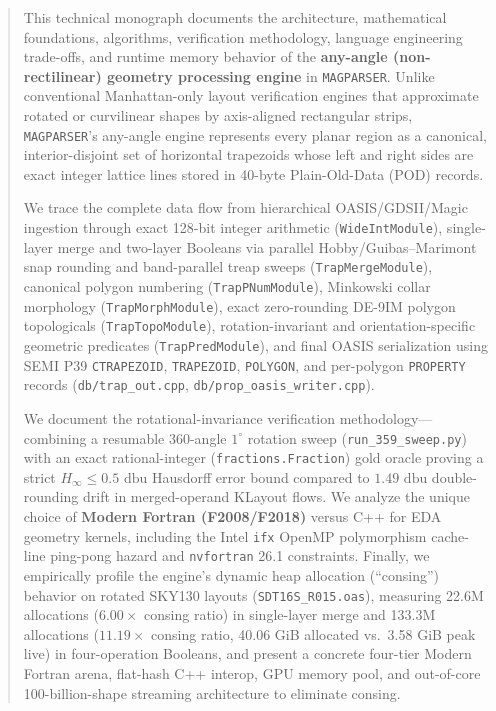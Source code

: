 \documentclass[11pt,letterpaper,oneside]{report}
\begin{document}
\begin{abstract}
This technical monograph documents the architecture, mathematical foundations, algorithms, verification methodology, language engineering trade-offs, and runtime memory behavior of the \textbf{any-angle (non-rectilinear) geometry processing engine} in \texttt{MAGPARSER}. Unlike conventional Manhattan-only layout verification engines that approximate rotated or curvilinear shapes by axis-aligned rectangular strips, \texttt{MAGPARSER}'s any-angle engine represents every planar region as a canonical, interior-disjoint set of horizontal trapezoids whose left and right sides are exact integer lattice lines stored in 40-byte Plain-Old-Data (POD) records.

We trace the complete data flow from hierarchical OASIS/GDSII/Magic ingestion through exact 128-bit integer arithmetic (\texttt{WideIntModule}), single-layer merge and two-layer Booleans via parallel Hobby/Guibas--Marimont snap rounding and band-parallel treap sweeps (\texttt{TrapMergeModule}), canonical polygon numbering (\texttt{TrapPNumModule}), Minkowski collar morphology (\texttt{TrapMorphModule}), exact zero-rounding DE-9IM polygon topologicals (\texttt{TrapTopoModule}), rotation-invariant and orientation-specific geometric predicates (\texttt{TrapPredModule}), and final OASIS serialization using SEMI P39 \texttt{CTRAPEZOID}, \texttt{TRAPEZOID}, \texttt{POLYGON}, and per-polygon \texttt{PROPERTY} records (\texttt{db/trap\_out.cpp}, \texttt{db/prop\_oasis\_writer.cpp}).

We document the rotational-invariance verification methodology---combining a resumable 360-angle $1^\circ$ rotation sweep (\texttt{run\_359\_sweep.py}) with an exact rational-integer (\texttt{fractions.Fraction}) gold oracle proving a strict $H_\infty \le 0.5\text{ dbu}$ Hausdorff error bound compared to $1.49\text{ dbu}$ double-rounding drift in merged-operand KLayout flows. We analyze the unique choice of \textbf{Modern Fortran (F2008/F2018)} versus C++ for EDA geometry kernels, including the Intel \texttt{ifx} OpenMP polymorphism cache-line ping-pong hazard and \texttt{nvfortran} 26.1 constraints. Finally, we empirically profile the engine's dynamic heap allocation (``consing'') behavior on rotated SKY130 layouts (\texttt{SDT16S\_R015.oas}), measuring 22.6M allocations ($6.00\times$ consing ratio) in single-layer merge and 133.3M allocations ($11.19\times$ consing ratio, 40.06 GiB allocated vs.\ 3.58 GiB peak live) in four-operation Booleans, and present a concrete four-tier Modern Fortran arena, flat-hash C++ interop, GPU memory pool, and out-of-core 100-billion-shape streaming architecture to eliminate consing.
\end{abstract}

\tableofcontents
\listoffigures
\listoftables
\clearpage












\end{document}
